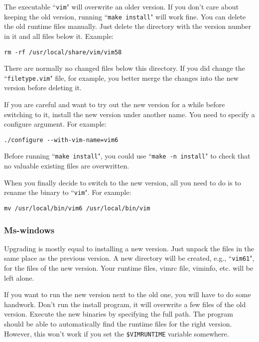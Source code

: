 The executable ``\texttt{vim}" will overwrite an older version.
If you don't care about keeping the old version, running ``\texttt{make install}" will work fine.
You can delete the old runtime files manually.
Just delete the directory with the version number in it and all files below it.
Example:

\begin{Verbatim}[samepage=true]
 rm -rf /usr/local/share/vim/vim58
\end{Verbatim}

There are normally no changed files below this directory.
If you did change the ``\texttt{filetype.vim}" file, for example, you better merge the changes into the new version before deleting it.

If you are careful and want to try out the new version for a while before switching to it, install the new version under another name.
You need to specify a configure argument.
For example:

\begin{Verbatim}[samepage=true]
 ./configure --with-vim-name=vim6
\end{Verbatim}

Before running ``\texttt{make install}", you could use ``\texttt{make -n install}" to check that no valuable existing files are overwritten.

When you finally decide to switch to the new version, all you need to do is to rename the binary to ``\texttt{vim}".
For example:

\begin{Verbatim}[samepage=true]
 mv /usr/local/bin/vim6 /usr/local/bin/vim
\end{Verbatim}

\subsubsection{Ms-windows}
Upgrading is mostly equal to installing a new version.
Just unpack the files in the same place as the previous version.
A new directory will be created, e.g., ``\texttt{vim61}", for the files of the new version.
Your runtime files, vimrc file, viminfo, etc. will be left alone.

If you want to run the new version next to the old one, you will have to do some handwork.
Don't run the install program, it will overwrite a few files of the old version.
Execute the new binaries by specifying the full path.
The program should be able to automatically find the runtime files for the right version.
However, this won't work if you set the \texttt{\$VIMRUNTIME} variable somewhere.

